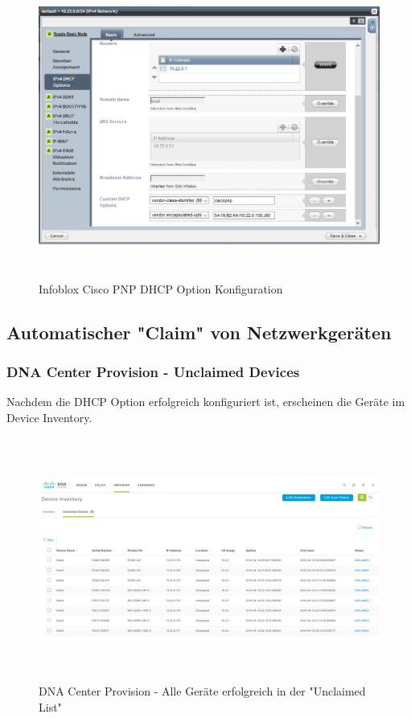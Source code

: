 \begin{figure}[H]
	\centering
	\includegraphics[height=10cm]{img/Infoblox_PNP.png}
	\caption{Infoblox Cisco PNP DHCP Option Konfiguration}
	\label{fig:cisco-pnp}
\end{figure}

\subsection{Automatischer "Claim" von Netzwerkgeräten}

\subsubsection{DNA Center Provision - Unclaimed Devices}

Nachdem die DHCP Option erfolgreich konfiguriert ist, erscheinen die Geräte im Device Inventory.

\begin{figure}[H]
	\centering
	\includegraphics[height=8cm]{img/DNA_Center_All_Fabric2_Unclaimed.PNG}
	\caption{DNA Center Provision - Alle Geräte erfolgreich in der "Unclaimed List"}
	\label{fig:dna-center-provision-unclaimed}
\end{figure}

